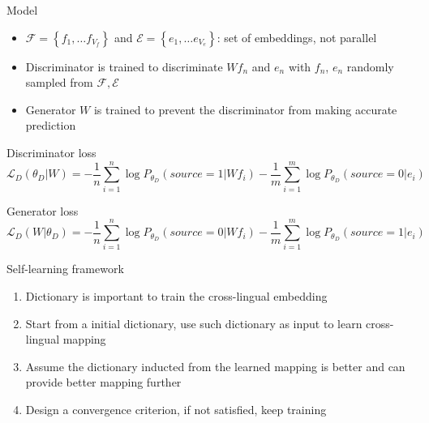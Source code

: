 \documentclass[11pt, a4paper, landscape]{article}
\begin{document}
	
	\NewPage
	\vfill
	Model
	\begin{itemize}
		\item  ${\mathcal{F} = \left\{ f_1, \ldots f_{V_f} \right\} }$ and  ${\mathcal{E} = \left\{ e_1, \ldots e_{V_e} \right\} }$: set of embeddings, not parallel
		\item Discriminator is trained to discriminate ${W{f_n}}$ and ${e_n}$ with ${f_n}$, ${e_n}$ randomly sampled from ${ \mathcal{F},  \mathcal{E} }$ 
		\item Generator ${W}$ is trained to prevent the discriminator from making accurate prediction
		
	\end{itemize}
	
	
	
	Discriminator loss
	\[ \mathcal{L}_D(\theta_D|W) = -\frac{1}{n}\sum_{i=1}^{n}\log P_{\theta_D}(source=1| W f_i) - \frac{1}{m}\sum_{i=1}^{m}\log P_{\theta_D}(source=0| e_i)\]
	
	
	Generator  loss 
	\[ \mathcal{L}_D(W|\theta_D) = -\frac{1}{n}\sum_{i=1}^{n}\log P_{\theta_D}(source=0| W f_i) - \frac{1}{m}\sum_{i=1}^{m}\log P_{\theta_D}(source=1| e_i)\]
	

	\NewPage
	\vfill
	Self-learning framework
	\begin{enumerate}
		\item Dictionary is important to train the cross-lingual embedding
		\item Start from a initial dictionary, use such dictionary as input to learn cross-lingual mapping
		\item Assume the dictionary inducted from the learned mapping is better and can provide better mapping further
		\item Design a convergence criterion, if not satisfied, keep training
	\end{enumerate}



	
	\vfill


	\NewPage
\end{document}

